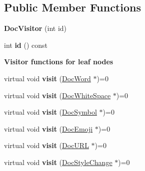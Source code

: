 \subsection*{Public Member Functions}
\begin{DoxyCompactItemize}
\item 
\mbox{\label{class_doc_visitor_a24962a0406b1d05920458f3d7d4fda8a}} 
{\bfseries Doc\+Visitor} (int id)
\item 
\mbox{\label{class_doc_visitor_ae3d07776c5fcdd86734eb48dc32b6c5f}} 
int {\bfseries id} () const
\end{DoxyCompactItemize}
\begin{Indent}\textbf{ Visitor functions for leaf nodes}\par
\begin{DoxyCompactItemize}
\item 
\mbox{\label{class_doc_visitor_aec59d1c93f82aad3569fb303f1e4d3f4}} 
virtual void {\bfseries visit} (\mbox{\hyperlink{class_doc_word}{Doc\+Word}} $\ast$)=0
\item 
\mbox{\label{class_doc_visitor_a68f7be9249997380d4ee39f608b21e28}} 
virtual void {\bfseries visit} (\mbox{\hyperlink{class_doc_white_space}{Doc\+White\+Space}} $\ast$)=0
\item 
\mbox{\label{class_doc_visitor_aff53bb2afd8f7dd963397eca8f53775d}} 
virtual void {\bfseries visit} (\mbox{\hyperlink{class_doc_symbol}{Doc\+Symbol}} $\ast$)=0
\item 
\mbox{\label{class_doc_visitor_ace2ecf37cf22c954209ec4febc8eb26e}} 
virtual void {\bfseries visit} (\mbox{\hyperlink{class_doc_emoji}{Doc\+Emoji}} $\ast$)=0
\item 
\mbox{\label{class_doc_visitor_ad4b4715c1f30e5b7f2492f61f58eb41e}} 
virtual void {\bfseries visit} (\mbox{\hyperlink{class_doc_u_r_l}{Doc\+U\+RL}} $\ast$)=0
\item 
\mbox{\label{class_doc_visitor_ae76aedd65bb04607b0b1475cc24720b1}} 
virtual void {\bfseries visit} (\mbox{\hyperlink{class_doc_style_change}{Doc\+Style\+Change}} $\ast$)=0

\end{DoxyCompactItemize}
\end{Indent}
